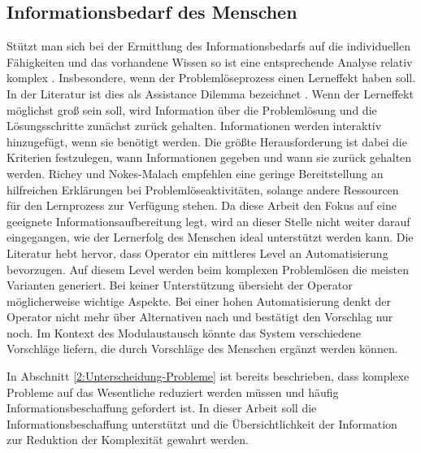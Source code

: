 \subsection{Informationsbedarf des Menschen}
\label{3:Informationsbedarf-Operator}
Stützt man sich bei der Ermittlung des Informationsbedarfs auf die individuellen Fähigkeiten und das vorhandene Wissen so ist eine entsprechende Analyse relativ komplex . Insbesondere, wenn der Problemlöseprozess einen Lerneffekt haben soll. In der Literatur ist dies als Assistance Dilemma bezeichnet \cite{Koedinger2007}. Wenn der Lerneffekt möglichst groß sein soll, wird Information über die Problemlösung und die Lösungsschritte zunächst zurück gehalten. Informationen werden interaktiv hinzugefügt, wenn sie benötigt werden. Die größte Herausforderung ist dabei die Kriterien festzulegen, wann Informationen gegeben und wann sie zurück gehalten werden\cite{Koedinger2007}.  Richey und Nokes-Malach \cite{Richey2013} empfehlen eine geringe Bereitstellung an hilfreichen Erklärungen bei Problemlöseaktivitäten, solange andere Ressourcen für den Lernprozess zur Verfügung stehen. Da diese Arbeit den Fokus auf eine geeignete Informationsaufbereitung legt, wird an dieser Stelle nicht weiter darauf eingegangen, wie der Lernerfolg des Menschen ideal unterstützt werden kann. Die Literatur \cite{Miller2005, Sauer2018} hebt hervor, dass Operator ein mittleres Level an Automatisierung bevorzugen. Auf diesem Level werden beim komplexen Problemlösen die meisten Varianten generiert. Bei keiner Unterstützung übersieht der Operator möglicherweise wichtige Aspekte. Bei einer hohen Automatisierung denkt der Operator nicht mehr über Alternativen nach und bestätigt den Vorschlag nur noch. \cite{Miller2005} Im Kontext des Modulaustausch könnte das System verschiedene Vorschläge liefern, die durch Vorschläge des Menschen ergänzt werden können.

In Abschnitt \ref{2:Unterscheidung-Probleme} ist bereits beschrieben, dass komplexe Probleme auf das Wesentliche reduziert werden müssen und häufig Informationsbeschaffung gefordert ist. In dieser Arbeit soll die Informationsbeschaffung unterstützt und die Übersichtlichkeit der Information zur Reduktion der Komplexität gewahrt werden.

